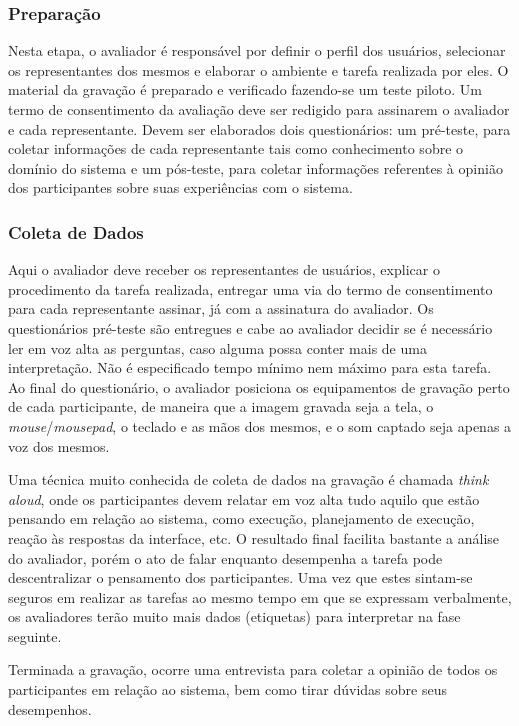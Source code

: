 \subsubsection{Preparação}

\indent Nesta etapa, o avaliador é responsável por definir o perfil dos usuários, selecionar os representantes dos mesmos e elaborar o ambiente e tarefa realizada por eles. O material da gravação é preparado e verificado fazendo-se um teste piloto. Um termo de consentimento da avaliação deve ser redigido para assinarem o avaliador e cada representante. Devem ser elaborados dois questionários: um pré-teste, para coletar informações de cada representante tais como conhecimento sobre o domínio do sistema e um pós-teste, para coletar informações referentes à opinião dos participantes sobre suas experiências com o sistema.

\subsubsection{Coleta de Dados}

\indent Aqui o avaliador deve receber os representantes de usuários, explicar o procedimento da tarefa realizada, entregar uma via do termo de consentimento para cada representante assinar, já com a assinatura do avaliador. Os questionários pré-teste são entregues e cabe ao avaliador decidir se é necessário ler em voz alta as perguntas, caso alguma possa conter mais de uma interpretação. Não é especificado tempo mínimo nem máximo para esta tarefa. Ao final do questionário, o avaliador posiciona os equipamentos de gravação perto de cada participante, de maneira que a imagem gravada seja a tela, o \textit{mouse}/\textit{mousepad}, o teclado e as mãos dos mesmos, e o som captado seja apenas a voz dos mesmos. 

\indent Uma técnica muito conhecida de coleta de dados na gravação é chamada \textit{think aloud}, onde os participantes devem relatar em voz alta tudo aquilo que estão pensando em relação ao sistema, como execução, planejamento de execução, reação às respostas da interface, etc. O resultado final facilita bastante a análise do avaliador, porém o ato de falar enquanto desempenha a tarefa pode descentralizar o pensamento dos participantes. Uma vez que estes sintam-se seguros em realizar as tarefas ao mesmo tempo em que se expressam verbalmente, os avaliadores terão muito mais dados (etiquetas) para interpretar na fase seguinte.

\indent Terminada a gravação, ocorre uma entrevista para coletar a opinião de todos os participantes em relação ao sistema, bem como tirar dúvidas sobre seus desempenhos.

